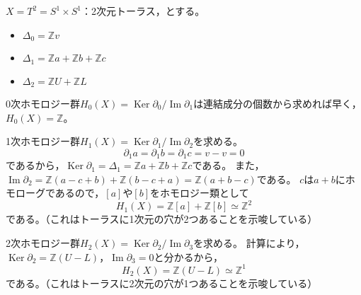 \documentclass[uplatex]{jsarticle}
\DeclareMathOperator{\Image}{Im}
\DeclareMathOperator{\Kernel}{Ker}
\begin{document}
\begin{rei}[トーラスのホモロジー群]
	$X = T^{2} = S^{1} \times S^{1}$：2次元トーラス，とする。
	\begin{center}
	\end{center}
	\begin{itemize}
		\vspace{-0.5\baselineskip}
		\item $\Delta_{0} = \mathbb{Z} v$
		\item $\Delta_{1} = \mathbb{Z} a + \mathbb{Z} b + \mathbb{Z} c$
		\item $\Delta_{2} = \mathbb{Z} U + \mathbb{Z} L$
	\end{itemize}

	0次ホモロジー群$H_{0}(X) = \Kernel \partial_{0} / \Image \partial_{1}$は連結成分の個数から求めれば早く，$H_{0}(X) = \mathbb{Z}$。

	1次ホモロジー群$H_{1}(X) = \Kernel \partial_{1} / \Image \partial_{2}$を求める。
	\begin{equation}
		\partial_{1} a = \partial_{1} b = \partial_{1} c = v - v = 0
	\end{equation}
	であるから，$\Kernel \partial_{1} = \Delta_{1} = \mathbb{Z} a + \mathbb{Z} b + \mathbb{Z} c$である。
	また，$\Image \partial_{2} = \mathbb{Z} (a-c+b) + \mathbb{Z} (b-c+a) = \mathbb{Z} (a+b-c)$である。
	$c$は$a+b$にホモローグであるので，$[a]$や$[b]$をホモロジー類として
	\begin{equation}
		H_{1}(X) = \mathbb{Z} [a] + \mathbb{Z} [b] \simeq \mathbb{Z}^{2}
	\end{equation}
	である。（これはトーラスに1次元の穴が2つあることを示唆している）

	2次ホモロジー群$H_{2}(X) = \Kernel \partial_{2} / \Image \partial_{3}$を求める。
	計算により，$\Kernel \partial_{2} = \mathbb{Z} (U-L)$，$\Image \partial_{3} = 0$と分かるから，
	\begin{equation}
		H_{2}(X) = \mathbb{Z} (U-L) \simeq \mathbb{Z}^{1}
	\end{equation}
	である。（これはトーラスに2次元の穴が1つあることを示唆している）


\end{rei}
\end{document}
